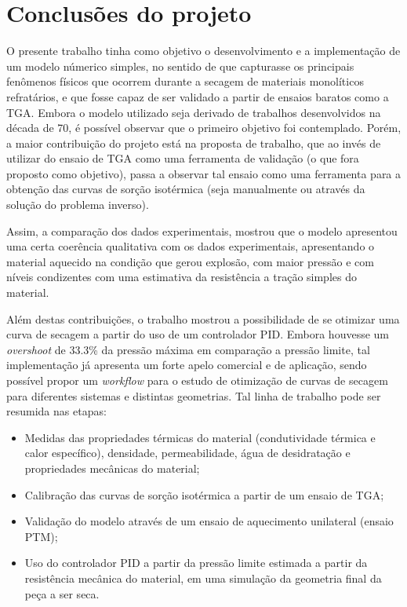 \section{Conclusões do projeto}
O presente trabalho tinha como objetivo o desenvolvimento e a implementação de
um modelo númerico simples, no sentido de que capturasse os principais fenômenos
físicos que ocorrem durante a secagem de materiais monolíticos refratários, e
que fosse capaz de ser validado a partir de ensaios baratos como a TGA. Embora
o modelo utilizado seja derivado de trabalhos desenvolvidos na década de 70, é
possível observar que o primeiro objetivo foi contemplado. Porém, a
maior contribuição do projeto está na proposta de trabalho, que ao invés de
utilizar do ensaio de TGA como uma ferramenta de validação (o que fora proposto
como objetivo), passa a observar tal ensaio como uma ferramenta para a obtenção
das curvas de sorção isotérmica (seja manualmente ou através da solução do
problema inverso).

Assim, a comparação dos dados experimentais, mostrou que o modelo apresentou uma
certa coerência qualitativa com os dados experimentais, apresentando o material
aquecido na condição que gerou explosão, com
maior pressão e com níveis condizentes com uma estimativa da resistência a
tração simples do material.

Além destas contribuições, o trabalho mostrou a possibilidade de se otimizar uma
curva de secagem a partir do uso de um controlador PID. Embora houvesse um {\it
  overshoot} de 33.3\% da pressão máxima em comparação a pressão limite, tal
implementação já apresenta um forte apelo comercial e de aplicação, sendo
possível propor um {\it workflow} para o estudo de otimização de curvas de
secagem para diferentes sistemas e distintas geometrias. Tal linha de trabalho
pode ser resumida nas etapas:

\begin{itemize}
  \item Medidas das propriedades térmicas do material (condutividade térmica e
    calor específico), densidade, permeabilidade, água de desidratação e
    propriedades mecânicas do material;
  \item Calibração das curvas de sorção isotérmica a partir de um ensaio de TGA;
  \item Validação do modelo através de um ensaio de aquecimento unilateral
    (ensaio PTM);
  \item Uso do controlador PID a partir da pressão limite estimada a partir da
    resistência mecânica do material, em uma simulação da geometria final da
    peça a ser seca.
\end{itemize}

